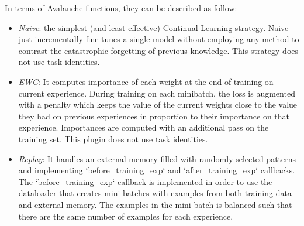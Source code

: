 \documentclass[english, LaM, oneside]{sapthesis}%
\begin{document}
In terms of Avalanche functions, they can be described as follow:
\begin{itemize}
    \item \textit{Naive}: the simplest (and least effective) Continual Learning strategy. Naive just incrementally fine tunes a single model without employing any method
    to contrast the catastrophic forgetting of previous knowledge.
    This strategy does not use task identities.
    \item \textit{EWC}: It computes importance of each weight at the end of training on current experience. During training on each minibatch, the loss is augmented
    with a penalty which keeps the value of the current weights close to the
    value they had on previous experiences in proportion to their importance
    on that experience. Importances are computed with an additional pass on the
    training set. This plugin does not use task identities.
    \item \textit{Replay}: It handles an external memory filled with randomly selected
    patterns and implementing `before\_training\_exp` and `after\_training\_exp`
    callbacks. 
    The `before\_training\_exp` callback is implemented in order to use the
    dataloader that creates mini-batches with examples from both training
    data and external memory. The examples in the mini-batch is balanced 
    such that there are the same number of examples for each experience.  
\end{itemize}



\newline \newline
\end{document}
